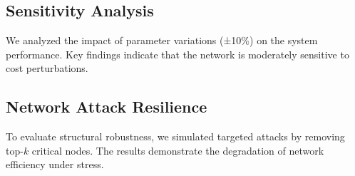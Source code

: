 
\subsection{Sensitivity Analysis}
We analyzed the impact of parameter variations (±10\%) on the system performance.
Key findings indicate that the network is moderately sensitive to cost perturbations.

\subsection{Network Attack Resilience}
To evaluate structural robustness, we simulated targeted attacks by removing top-$k$ critical nodes.
The results demonstrate the degradation of network efficiency under stress.

